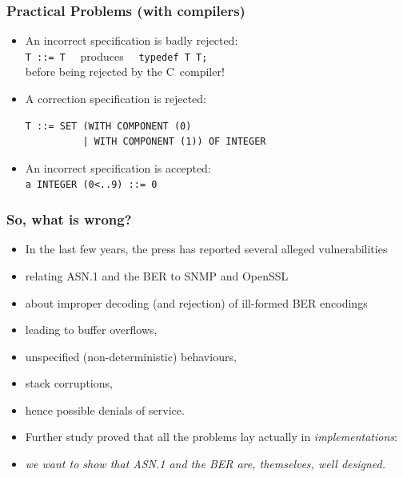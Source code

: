 \documentclass[compress,dvips,xcolor={dvipsnames},t]{beamer}
\newcommand\ASN{\textsf{ASN.1}\xspace}
\begin{document}
\begin{frame}[containsverbatim]
\frametitle{Practical Problems (with compilers)}

\begin{itemize}

   \item An incorrect specification is badly rejected: \\
         \verb+T ::= T+ \ \ produces \ \ \verb+typedef T T;+ \\
         before being rejected by the C~compiler!

   \item A correction specification is rejected:
\begin{verbatim}
T ::= SET (WITH COMPONENT (0)
          | WITH COMPONENT (1)) OF INTEGER
\end{verbatim}

           \item An incorrect specification is accepted:\\
                 \verb+a INTEGER (0<..9) ::= 0+
\end{itemize}

\end{frame}

\begin{frame}
\frametitle{So, what is wrong?}

\begin{itemize}

  \item In the last few years, the press has reported several alleged
  vulnerabilities

  \item relating \ASN and the BER to SNMP and OpenSSL

  \item about improper decoding (and rejection) of ill-formed BER
  encodings

  \item leading to buffer overflows,

  \item unspecified (non-deterministic) behaviours,

  \item stack corruptions,

  \item hence possible denials of service.

  \item Further study proved that all the problems lay actually in
  \emph{implementations}:

  \item \emph{we want to show that \ASN and the BER are, themselves,
  well designed.}

\end{itemize}

\end{frame}
\end{document}
